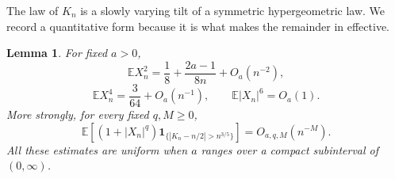 \documentclass[11pt,a4paper]{amsart}
\numberwithin{equation}{section}
\theoremstyle{plain}
\newtheorem{lemma}[theorem]{Lemma}
\theoremstyle{definition}
\newcommand{\E}{\mathbb E}
\begin{document}
The law of \(K_n\) is a slowly varying tilt of a symmetric hypergeometric law.
We record a quantitative form because it is what makes the remainder in
 effective.

\begin{lemma}\label{lem:central-moments}
For fixed \(a>0\),
\begin{equation}\label{eq:X2-asymptotic}
 \E X_n^2
 =\frac18+\frac{2a-1}{8n}+O_a(n^{-2}),
\end{equation}
\begin{equation}\label{eq:X4-asymptotic}
 \E X_n^4=\frac3{64}+O_a(n^{-1}),
 \qquad
 \E|X_n|^6=O_a(1).
\end{equation}
More strongly, for every fixed \(q,M\ge0\),
\begin{equation}\label{eq:tilted-tail}
 \E\!\left[(1+|X_n|^q)
 \mathbf 1_{\{|K_n-n/2|>n^{3/5}\}}\right]
 =O_{a,q,M}(n^{-M}).
\end{equation}
All these estimates are uniform when \(a\) ranges over a compact subinterval
of \((0,\infty)\).
\end{lemma}
\end{document}
